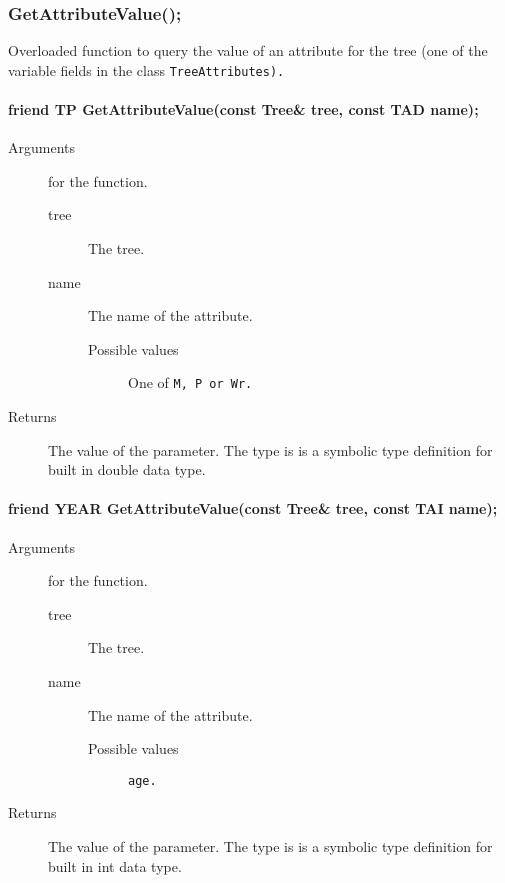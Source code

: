 \subsubsection{GetAttributeValue();}
Overloaded function to query the value of an attribute 
for the tree (one of the variable fields in the class 
\tt TreeAttributes\rm).

\paragraph{friend TP GetAttributeValue(const Tree\& tree,
                                       const TAD name);}
\begin{description}
  \item[Arguments] for the function.
    \begin{description}
      \item[tree] The tree.
      \item[name] The name of the attribute.
        \begin{description}
          \item[Possible values] One of \tt M, P \rm or \tt Wr\rm.
        \end{description}
     \end{description}
   \item[Returns] The value of the parameter. The type is
                  is a symbolic type definition for built 
                  in double data type.
\end{description}

\paragraph{friend YEAR GetAttributeValue(const Tree\& tree,
                                         const TAI name);}
\begin{description}
  \item[Arguments] for the function.
    \begin{description}
      \item[tree] The tree.
      \item[name] The name of the attribute.
        \begin{description}
          \item[Possible values] \tt age\rm.
        \end{description}
     \end{description}
   \item[Returns] The value of the parameter. The type is
                  is a symbolic type definition for built 
                  in int data type.
\end{description}

